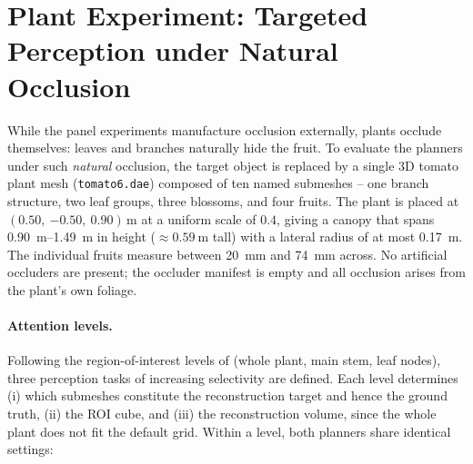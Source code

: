 
\section{Plant Experiment: Targeted Perception under Natural Occlusion}
\label{sec:tree-setup}

While the panel experiments manufacture occlusion externally, plants occlude
themselves: leaves and branches naturally hide the fruit. To evaluate the
planners under such \emph{natural} occlusion, the target object is replaced
by a single 3D tomato plant mesh (\texttt{tomato6.dae}) composed of ten named
submeshes -- one branch structure, two leaf groups, three blossoms, and four
fruits. The plant is placed at $(0.50,\ {-0.50},\ 0.90)$\,m at a uniform scale
of $0.4$, giving a canopy that spans \SIrange{0.90}{1.49}{\metre} in height
($\approx\SI{0.59}{\metre}$ tall) with a lateral radius of at most
\SI{0.17}{\metre}. The individual fruits measure between \SI{20}{\milli\metre}
and \SI{74}{\milli\metre} across. No artificial occluders are present; the
occluder manifest is empty and all occlusion arises from the plant's own
foliage.\\

\paragraph{Attention levels.} Following the region-of-interest levels of
\citet{burusa2024} (whole plant, main stem, leaf nodes), three perception
tasks of increasing selectivity are defined. Each level determines (i) which
submeshes constitute the reconstruction target and hence the ground truth,
(ii) the ROI cube, and (iii) the reconstruction volume, since the whole plant
does not fit the default grid. Within a level, both planners share identical
settings:

